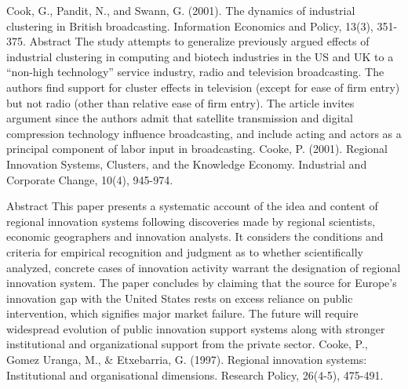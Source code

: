 \documentclass[a4paper,11pt]{article}
\begin{document}
Cook, G., Pandit, N., and Swann, G. (2001). The dynamics of industrial clustering in British broadcasting. Information Economics and Policy, 13(3), 351-375.
Abstract
The study attempts to generalize previously argued effects of industrial clustering in computing and biotech industries in the US and UK to a “non-high technology” service industry, radio and television broadcasting. The authors find support for cluster effects in television (except for ease of firm entry) but not radio (other than relative ease of firm entry). The article invites argument since the authors admit that satellite transmission and digital compression technology influence broadcasting, and include acting and actors as a principal component of labor input in broadcasting.
Cooke, P. (2001). Regional Innovation Systems, Clusters, and the Knowledge Economy.
Industrial and Corporate Change, 10(4), 945-974.

Abstract
This paper presents a systematic account of the idea and content of regional innovation systems following discoveries made by regional scientists, economic geographers and innovation analysts. It considers the conditions and criteria for empirical recognition and judgment as to whether scientifically analyzed, concrete cases of innovation activity warrant the designation of regional innovation system. The paper concludes by claiming that the source for Europe's innovation gap with the United States rests on excess reliance on public intervention, which signifies major market failure. The future will require widespread evolution of public innovation support systems along with stronger institutional and organizational support from the private sector.
Cooke, P., Gomez Uranga, M., & Etxebarria, G. (1997). Regional innovation systems: Institutional and organisational dimensions. Research Policy, 26(4-5), 475-491.
 
\end{document}
